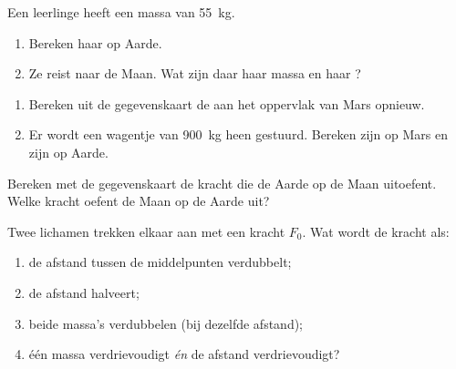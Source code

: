 \begin{exercise}[$\star$]\label{exo:g10:universal-gravitation:2}
Een leerlinge heeft een massa van \qty{55}{kg}.
\begin{enumerate}
  \item Bereken haar  op Aarde.
  \item Ze reist naar de Maan. Wat zijn daar haar massa en haar ?
\end{enumerate}
\end{exercise}

\begin{exercise}[$\star$]\label{exo:g10:universal-gravitation:3}
\begin{enumerate}
  \item Bereken uit de gegevenskaart de  aan het
        oppervlak van Mars opnieuw.
  \item Er wordt een wagentje van \qty{900}{kg} heen gestuurd. Bereken
        zijn  op Mars en zijn  op Aarde.
\end{enumerate}
\end{exercise}

\begin{exercise}[$\star$]\label{exo:g10:universal-gravitation:4}
Bereken met de gegevenskaart de kracht die de Aarde op de Maan
uitoefent. Welke kracht oefent de Maan op de Aarde uit?
\end{exercise}

\begin{exercise}[$\star$]\label{exo:g10:universal-gravitation:5}
Twee lichamen trekken elkaar aan met een kracht $F_0$. Wat wordt de
kracht als:
\begin{enumerate}
  \item de afstand tussen de middelpunten verdubbelt;
  \item de afstand halveert;
  \item beide massa's verdubbelen (bij dezelfde afstand);
  \item één massa verdrievoudigt \emph{én} de afstand verdrievoudigt?
\end{enumerate}
\end{exercise}

